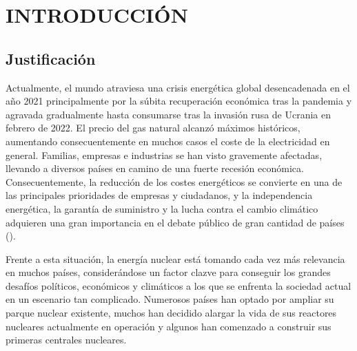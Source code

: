 \section{INTRODUCCIÓN} \label{sec:introduccion}

\subsection{Justificación}

Actualmente, el mundo atraviesa una crisis energética global desencadenada en el año 2021 principalmente por la súbita recuperación económica tras la pandemia y agravada gradualmente hasta consumarse tras la invasión rusa de Ucrania en febrero de 2022. El precio del gas natural alcanzó máximos históricos, aumentando consecuentemente en muchos casos el coste de la electricidad en general. Familias, empresas e industrias se han visto gravemente afectadas, llevando a diversos países en camino de una fuerte recesión económica. Consecuentemente, la reducción de los costes energéticos se convierte en una de las principales prioridades de empresas y ciudadanos, y la independencia energética, la
garantía de suministro y la lucha contra el cambio climático adquieren una gran importancia en el debate público de gran cantidad de países (\cite{crisis_energetica_iea}). 

Frente a esta situación, la energía nuclear está tomando cada vez más relevancia en muchos países, considerándose un factor clazve para conseguir los grandes desafíos políticos, económicos y climáticos  a los que se enfrenta la sociedad actual en un escenario tan complicado. Numerosos países han optado por ampliar su parque nuclear existente, muchos han decidido alargar la vida de sus reactores nucleares actualmente en operación y algunos han comenzado a construir sus primeras centrales nucleares. 

